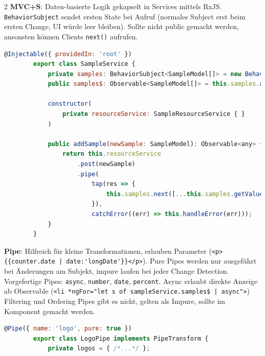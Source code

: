 \documentclass[10pt,landscape]{article}
\begin{document}
\begin{multicols}{2}
        \textbf{MVC+S}: Daten-basierte Logik gekapselt in Services mittels RxJS.
        \lstinline{BehaviorSubject} sendet ersten State bei Aufruf (normales Subject erst beim ersten Change, UI würde leer bleiben).
        Sollte nicht public gemacht werden, ansonsten können Clients \lstinline{next()} aufrufen.

        \begin{lstlisting}[language=JavaScript]
        @Injectable({ providedIn: 'root' })
        export class SampleService {
            private samples: BehaviorSubject<SampleModel[]> = new BehaviorSubject([]); // Event bus which is used to store the last state and to notify subscribers about updates.
            public samples$: Observable<SampleModel[]> = this.samples.asObservable(); // Convert event bus into an observable, which can be provided to the UI or other services.

            constructor(
                private resourceService: SampleResourceService { }
            )

            public addSample(newSample: SampleModel): Observable<any> {
                return this.resourceService
                    .post(newSample)
                    .pipe(
                        tap(res => {
                            this.samples.next([...this.samples.getValue(), newSample]); //  Store the retrieved data into the BehaviorSubject and emit the data changed event. Create a new array, otherwise the pipe cannot track the change.
                        }),
                        catchError((err) => this.handleError(err)));
            }
        }
        \end{lstlisting}

        \textbf{Pipe}: Hilfreich für kleine Transformationen, erlauben Parameter (\lstinline!<p>{{counter.date | date:'longDate'}}</p>!). Pure Pipes werden nur ausgeführt bei Änderungen am Subjekt, impure laufen bei jeder Change Detection.
        Vorgefertige Pipes: \lstinline{async}, \lstinline{number}, \lstinline{date}, \lstinline{percent}.
        Async erlaubt direkte Anzeige ab Observable (\lstinline!<li *ngFor="let s of sampleService.samples$ | async">!)
        Filtering und Ordering Pipes gibt es nicht, gelten als Impure, sollte im Komponent gemacht werden.

        \begin{lstlisting}[language=JavaScript]
        @Pipe({ name: 'logo', pure: true })
        export class LogoPipe implements PipeTransform {
            private logos = { /*...*/ };


\end{lstlisting}
\end{multicols}
\end{document}
